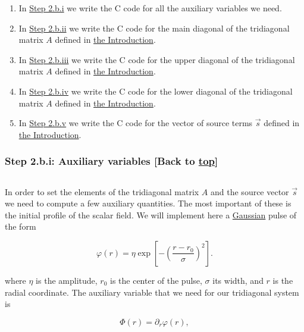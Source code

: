 \documentclass[landscape,letterpaper,10pt,english]{article}
\providecommand{\tightlist}{%
      \setlength{\itemsep}{0pt}\setlength{\parskip}{0pt}}
\begin{document}
\begin{enumerate}
\def\labelenumi{\arabic{enumi}.}
\tightlist
\item
  In \hyperref[tridiag_system_aux_vars]{Step 2.b.i} we write the C code
  for all the auxiliary variables we need.
\item
  In \hyperref[tridiag_system_main_diag]{Step 2.b.ii} we write the C
  code for the main diagonal of the tridiagonal matrix \(A\) defined in
  \hyperref[introduction]{the Introduction}.
\item
  In \hyperref[tridiag_system_upper_diag]{Step 2.b.iii} we write the C
  code for the upper diagonal of the tridiagonal matrix \(A\) defined in
  \hyperref[introduction]{the Introduction}.
\item
  In \hyperref[tridiag_system_lower_diag]{Step 2.b.iv} we write the C
  code for the lower diagonal of the tridiagonal matrix \(A\) defined in
  \hyperref[introduction]{the Introduction}.
\item
  In \hyperref[tridiag_system_source_vector]{Step 2.b.v} we write the C
  code for the vector of source terms \(\vec{s}\) defined in
  \hyperref[introduction]{the Introduction}.
\end{enumerate}

    \hypertarget{step-2.b.i-auxiliary-variables-back-to-top}{%
\subsubsection{\texorpdfstring{Step 2.b.i: Auxiliary variables {[}Back
to
\hyperref[toc]{top}{]}}{Step 2.b.i: Auxiliary variables {[}Back to {]}}}\label{step-2.b.i-auxiliary-variables-back-to-top}}

\[\label{tridiag_system_aux_vars}\]

In order to set the elements of the tridiagonal matrix \(A\) and the
source vector \(\vec{s}\) we need to compute a few auxiliary quantities.
The most important of these is the initial profile of the scalar field.
We will implement here a
\href{https://en.wikipedia.org/wiki/Gaussian_function}{Gaussian} pulse
of the form

\[
\varphi(r) = \eta \exp\left[-\left(\frac{r-r_{0}}{\sigma}\right)^{2}\right].
\]

where \(\eta\) is the amplitude, \(r_{0}\) is the center of the pulse,
\(\sigma\) its width, and \(r\) is the radial coordinate. The auxiliary
variable that we need for our tridiagonal system is

\[
\Phi(r) = \partial_{r}\varphi(r),
\]
\end{document}

